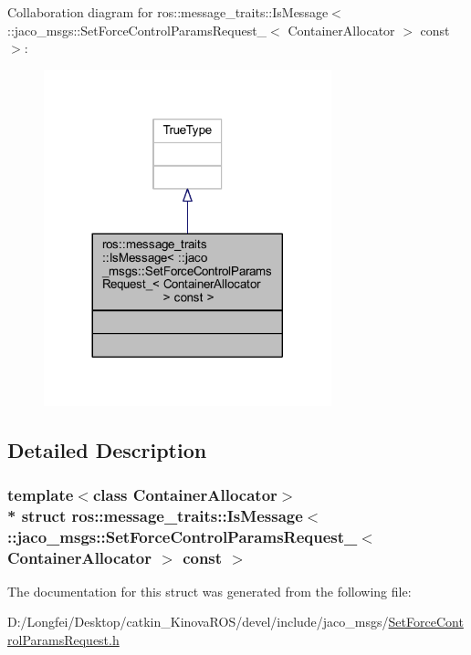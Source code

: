 Collaboration diagram for ros\+:\+:message\+\_\+traits\+:\+:Is\+Message$<$ \+:\+:jaco\+\_\+msgs\+:\+:Set\+Force\+Control\+Params\+Request\+\_\+$<$ Container\+Allocator $>$ const $>$\+:
\nopagebreak
\begin{figure}[H]
\begin{center}
\leavevmode
\includegraphics[width=236pt]{d8/d40/structros_1_1message__traits_1_1IsMessage_3_01_1_1jaco__msgs_1_1SetForceControlParamsRequest___32695035fd84174fc1e382e87698e22fc}
\end{center}
\end{figure}


\subsection{Detailed Description}
\subsubsection*{template$<$class Container\+Allocator$>$\\*
struct ros\+::message\+\_\+traits\+::\+Is\+Message$<$ \+::jaco\+\_\+msgs\+::\+Set\+Force\+Control\+Params\+Request\+\_\+$<$ Container\+Allocator $>$ const  $>$}



The documentation for this struct was generated from the following file\+:\begin{DoxyCompactItemize}
\item 
D\+:/\+Longfei/\+Desktop/catkin\+\_\+\+Kinova\+R\+O\+S/devel/include/jaco\+\_\+msgs/\hyperlink{SetForceControlParamsRequest_8h}{Set\+Force\+Control\+Params\+Request.\+h}\end{DoxyCompactItemize}
